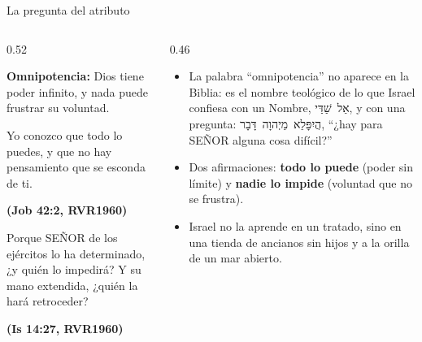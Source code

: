 \documentclass[hyperref={bookmarks=false},aspectratio=169]{beamer}
\newcommand{\heb}[1]{\mbox{\foreignlanguage{hebrew}{#1}}}
\newcommand{\SENOR}{S{\fontsize{0.78em}{1em}\selectfont EÑOR}}
\newcommand{\fuente}[1]{\par\hfill{\upshape\bfseries\footnotesize\textcolor{azul}{#1}}}
\newcommand{\destacar}[1]{\textbf{\textcolor{azul}{#1}}}
\begin{document}
\begin{frame}{La pregunta del atributo}
\begin{columns}[c,onlytextwidth]
\begin{column}{0.52\textwidth}
\begin{tcolorbox}[colback=papiro,colframe=azul,boxrule=1pt,arc=3pt]
\small\textbf{Omnipotencia:} Dios tiene poder infinito, y nada puede frustrar su voluntad.
\end{tcolorbox}
\begin{cita}Yo conozco que todo lo puedes, y que no hay pensamiento que se esconda de ti.\fuente{(Job 42:2, RVR1960)}\end{cita}
\begin{cita}Porque \SENOR{} de los ejércitos lo ha determinado, ¿y quién lo impedirá? Y su mano extendida, ¿quién la hará retroceder?\fuente{(Is 14:27, RVR1960)}\end{cita}
\end{column}
\begin{column}{0.46\textwidth}\small
\begin{itemize}
\item La palabra ``omnipotencia'' no aparece en la Biblia: es el nombre teológico de lo que Israel confiesa con un Nombre, \heb{אֵל שַׁדַּי}, y con una pregunta: \heb{הֲיִפָּלֵא מֵיְהוָה דָּבָר}, ``¿hay para \SENOR{} alguna cosa difícil?''
\item Dos afirmaciones: \destacar{todo lo puede} (poder sin límite) y \destacar{nadie lo impide} (voluntad que no se frustra).
\item Israel no la aprende en un tratado, sino en una tienda de ancianos sin hijos y a la orilla de un mar abierto.
\end{itemize}
\end{column}
\end{columns}
\end{frame}
\end{document}
